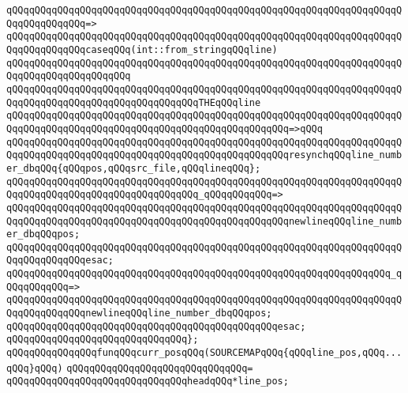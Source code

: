 \verb|qQQqqQQqqQQqqQQqqQQqqQQqqQQqqQQqqQQqqQQqqQQqqQQqqQQqqQQqqQQqqQQqqQQqqQQqqQQqqQQqqQQq=>|\newline
\verb|qQQqqQQqqQQqqQQqqQQqqQQqqQQqqQQqqQQqqQQqqQQqqQQqqQQqqQQqqQQqqQQqqQQqqQQqqQQqqQQqqQQqcaseqQQq(int::from_stringqQQqline)|\newline
\verb|qQQqqQQqqQQqqQQqqQQqqQQqqQQqqQQqqQQqqQQqqQQqqQQqqQQqqQQqqQQqqQQqqQQqqQQqqQQqqQQqqQQqqQQqqQQq|\newline
\verb|qQQqqQQqqQQqqQQqqQQqqQQqqQQqqQQqqQQqqQQqqQQqqQQqqQQqqQQqqQQqqQQqqQQqqQQqqQQqqQQqqQQqqQQqqQQqqQQqqQQqqQQqTHEqQQqline|\newline
\verb|qQQqqQQqqQQqqQQqqQQqqQQqqQQqqQQqqQQqqQQqqQQqqQQqqQQqqQQqqQQqqQQqqQQqqQQqqQQqqQQqqQQqqQQqqQQqqQQqqQQqqQQqqQQqqQQqqQQqqQQq=>qQQq|\newline
\verb|qQQqqQQqqQQqqQQqqQQqqQQqqQQqqQQqqQQqqQQqqQQqqQQqqQQqqQQqqQQqqQQqqQQqqQQqqQQqqQQqqQQqqQQqqQQqqQQqqQQqqQQqqQQqqQQqqQQqqQQqresynchqQQqline_number_dbqQQq{qQQqpos,qQQqsrc_file,qQQqlineqQQq};|\newline
\newline
\verb|qQQqqQQqqQQqqQQqqQQqqQQqqQQqqQQqqQQqqQQqqQQqqQQqqQQqqQQqqQQqqQQqqQQqqQQqqQQqqQQqqQQqqQQqqQQqqQQqqQQqqQQq_qQQqqQQqqQQq=>|\newline
\verb|qQQqqQQqqQQqqQQqqQQqqQQqqQQqqQQqqQQqqQQqqQQqqQQqqQQqqQQqqQQqqQQqqQQqqQQqqQQqqQQqqQQqqQQqqQQqqQQqqQQqqQQqqQQqqQQqqQQqqQQqnewlineqQQqline_number_dbqQQqpos;|\newline
\verb|qQQqqQQqqQQqqQQqqQQqqQQqqQQqqQQqqQQqqQQqqQQqqQQqqQQqqQQqqQQqqQQqqQQqqQQqqQQqqQQqqQQqesac;|\newline
\newline
\verb|qQQqqQQqqQQqqQQqqQQqqQQqqQQqqQQqqQQqqQQqqQQqqQQqqQQqqQQqqQQqqQQqqQQq_qQQqqQQqqQQq=>|\newline
\verb|qQQqqQQqqQQqqQQqqQQqqQQqqQQqqQQqqQQqqQQqqQQqqQQqqQQqqQQqqQQqqQQqqQQqqQQqqQQqqQQqqQQqnewlineqQQqline_number_dbqQQqpos;|\newline
\verb|qQQqqQQqqQQqqQQqqQQqqQQqqQQqqQQqqQQqqQQqqQQqqQQqesac;|\newline
\verb|qQQqqQQqqQQqqQQqqQQqqQQqqQQqqQQq};|\newline
\newline
\newline
\verb|qQQqqQQqqQQqqQQqfunqQQqcurr_posqQQq(SOURCEMAPqQQq{qQQqline_pos,qQQq...qQQq}qQQq)|\newline
\verb|qQQqqQQqqQQqqQQqqQQqqQQqqQQqqQQq=|\newline
\verb|qQQqqQQqqQQqqQQqqQQqqQQqqQQqqQQqheadqQQq*line_pos;|\newline
